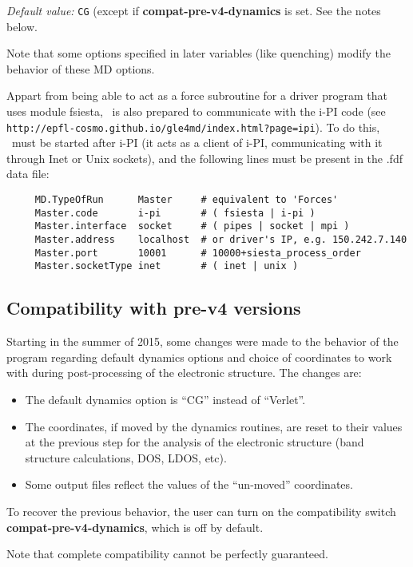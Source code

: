 \textit{Default value:} \texttt{CG} (except if \textbf{compat-pre-v4-dynamics}
is set. See the notes below.

Note that some options specified in later variables
(like quenching) modify the behavior of these MD options.

Appart from being able to act as a force subroutine for a driver program that
uses module fsiesta, \siesta\ is also prepared to communicate with the 
i-PI code (see \texttt{http://epfl-cosmo.github.io/gle4md/index.html?page=ipi}).
To do this, \siesta\ must be started after i-PI (it acts as a client of
i-PI, communicating with it through Inet or Unix sockets), and the following 
lines must be present in the .fdf data file:
\begin{verbatim}
     MD.TypeOfRun      Master     # equivalent to 'Forces'
     Master.code       i-pi       # ( fsiesta | i-pi )
     Master.interface  socket     # ( pipes | socket | mpi )
     Master.address    localhost  # or driver's IP, e.g. 150.242.7.140
     Master.port       10001      # 10000+siesta_process_order
     Master.socketType inet       # ( inet | unix )
\end{verbatim}

\subsection{Compatibility with pre-v4 versions}

Starting in the summer of 2015, some changes were made to the behavior
of the program regarding default dynamics options and choice of
coordinates to work with during post-processing of the electronic
structure. The changes are:

\begin{itemize}
\item The default dynamics option is ``CG'' instead of ``Verlet''.
\item The coordinates, if moved by the dynamics routines, are reset to
their values at the previous step for the analysis of the electronic 
structure (band structure calculations, DOS, LDOS, etc).
\item Some output files reflect the values of the ``un-moved''
  coordinates.
\end{itemize}

To recover the previous behavior, the user can turn on the
compatibility switch \textbf{compat-pre-v4-dynamics}, which is off by
default.

Note that complete compatibility cannot be perfectly guaranteed.

